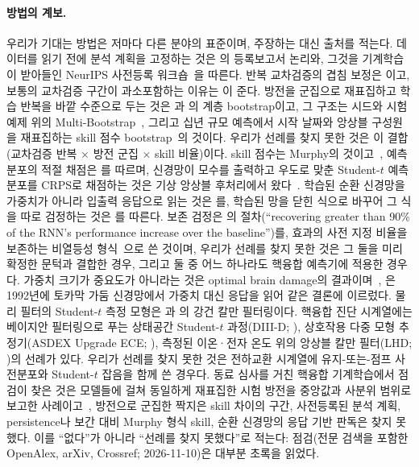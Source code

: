 \documentclass[10pt,a4paper]{article}
\begin{document}
\paragraph{방법의 계보.}
우리가 기대는 방법은 저마다 다른 분야의 표준이며, 주장하는 대신 출처를 적는다.
데이터를 읽기 전에 분석 계획을 고정하는 것은 \citet{Nosek2014RegisteredReports}의
등록보고서 논리와, 그것을 기계학습이 받아들인 NeurIPS 사전등록
워크숍~\citep{Bertinetto2021Preregistration}을 따른다. 반복 교차검증의 겹침 보정은
\citet{Nadeau2003Inference}이고, 보통의 교차검증 구간이 과소포함하는 이유는
\citet{Bates2024CrossValidation}이 준다. 방전을 군집으로 재표집하고 학습 반복을 바깥
수준으로 두는 것은 \citet{Saravanan2020Hierarchical}과 \citet{Ren2010Nonparametric}의
계층 bootstrap이고, 그 구조는 시드와 시험 예제 위의
Multi-Bootstrap~\citep{Sellam2022MultiBERTs}, 그리고 십년 규모 예측에서 시작 날짜와
앙상블 구성원을 재표집하는 skill 점수 bootstrap~\citep{Goddard2013Verification}의
것이다. 우리가 선례를 찾지 못한 것은 이 결합(교차검증 반복 $\times$ 방전 군집 $\times$
skill 비율)이다. skill 점수는 Murphy의 것이고~\citep{murphy1988}, 예측 분포의
적절 채점은 \citet{Gneiting2007StrictlyProper}를 따르며, 신경망이 모수를 출력하고
우도로 맞춘 Student-$t$ 예측 분포를 CRPS로 채점하는 것은 기상 앙상블
후처리에서 왔다~\citep{Gebetsberger2018Estimation,Rasp2018NeuralNetworks}. 학습된 순환
신경망을 가중치가 아니라 입출력 응답으로 읽는 것은
\citet{Sussillo2013OpeningBlackBox}를, 학습된 망을 닫힌 식으로 바꾸어 그 식을 따로
검정하는 것은 \citet{Cranmer2020DiscoveringSymbolic}를 따른다. 보존 검정은
\citet{Maheswaranathan2020HowRecurrent}의 절차(``recovering greater than 90\% of the
RNN's performance increase over the baseline'')를, 효과의 사전 지정 비율을 보존하는
비열등성 형식~\citep{Rothmann2003Design}으로 쓴 것이며, 우리가 선례를 찾지 못한 것은
그 둘을 미리 확정한 문턱과 결합한 경우, 그리고 둘 중 어느 하나라도 핵융합 예측기에
적용한 경우다. 가중치 크기가 중요도가 아니라는 것은
optimal brain damage의 결과이며~\citep{LeCun1990OptimalBrainDamage},
\citet{Allen1992NeuralNetwork}은 1992년에 토카막 가둠 신경망에서 가중치 대신 응답을
읽어 같은 결론에 이르렀다. 물리 필터의 Student-$t$ 측정 모형은
\citet{Roth2013StudentT}과 \citet{Agamennoni2012ApproximateInference}의 강건 칼만
필터링이다. 핵융합 진단 시계열에는 베이지안 필터링으로 푸는 상태공간 Student-$t$
과정(DIII-D; \citealp{Rath2022DataAugmentation}), 상호작용 다중 모형 추정기(ASDEX
Upgrade ECE; \citealp{vandenBrand2016ModelBased}), 측정된 이온·전자 온도 위의 앙상블
칼만 필터(LHD; \citealp{Morishita2020DataAssimilation})의 선례가 있다. 우리가 선례를
찾지 못한 것은 전하교환 시계열에 유지-또는-점프 사전분포와 Student-$t$ 잡음을 함께 쓴
경우다. 동료 심사를 거친 핵융합 기계학습에서 점검이 찾은 것은 모델들에 걸쳐 동일하게
재표집한 시험 방전을 중앙값과 사분위 범위로 보고한
사례이고~\citep{Keith2024RiskAware}, 방전으로 군집한 짝지은 skill 차이의 구간,
사전등록된 분석 계획, persistence나 보간 대비 Murphy 형식 skill, 순환 신경망의 응답
기반 판독은 찾지 못했다. 이를 ``없다''가 아니라 ``선례를 찾지 못했다''로 적는다:
점검(전문 검색을 포함한 OpenAlex, arXiv, Crossref; 2026-11-10)은 대부분 초록을 읽었다.
\end{document}
